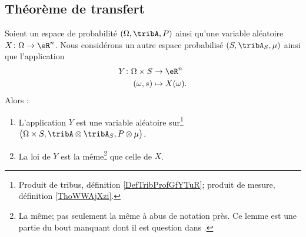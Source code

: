 \subsection{Théorème de transfert}

\begin{lemma}       \label{LEMooHVFJooBDZYnT}
	Soient un espace de probabilité \( (\Omega,\tribA,P)\) ainsi qu'une variable aléatoire \( X\colon \Omega\to \eR^n\). Nous considérons un autre espace probabilisé \( (S,\tribA_S,\mu)\) ainsi que l'application
	\begin{equation}
		\begin{aligned}
			Y\colon \Omega\times S & \to \eR^n          \\
			(\omega,s)             & \mapsto X(\omega).
		\end{aligned}
	\end{equation}
	Alors :
	\begin{enumerate}
		\item   \label{ITEMooDSIKooSqdyJb}
		      L'application \( Y\) est une variable aléatoire sur\footnote{Produit de tribus, définition \ref{DefTribProfGfYTuR}; produit de mesure, définition \ref{ThoWWAjXzi}.} \( \big( \Omega\times S,\tribA\otimes\tribA_S,P\otimes\mu \big)\).
		\item   \label{ITEMooQMMHooPcGKoD}
		      La loi de \( Y\) est la même\footnote{La même; pas seulement la même à abus de notation près. Ce lemme est une partie du bout manquant dont il est question dans \cite{BIBooWPRAooVIOYhF}.} que celle de \( X\).
	\end{enumerate}
\end{lemma}


